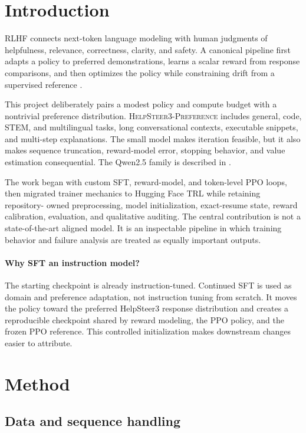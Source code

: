 \documentclass[10pt,twocolumn]{article}
\newcommand{\dataset}{\textsc{HelpSteer3-Preference}}
\newcommand{\trl}{\textsc{TRL}}
\begin{document}
\section{Introduction}

RLHF connects next-token language modeling with human judgments of helpfulness,
relevance, correctness, clarity, and safety. A canonical pipeline first adapts
a policy to preferred demonstrations, learns a scalar reward from response
comparisons, and then optimizes the policy while constraining drift from a
supervised reference \cite{stiennon2020,ouyang2022}.

This project deliberately pairs a modest policy and compute budget with a
nontrivial preference distribution. \dataset{} includes general, code, STEM,
and multilingual tasks, long conversational contexts, executable snippets,
and multi-step explanations. The small model makes iteration feasible, but it
also makes sequence truncation, reward-model error, stopping behavior, and
value estimation consequential. The Qwen2.5 family is described in
\cite{qwen25}.

The work began with custom SFT, reward-model, and token-level PPO loops, then
migrated trainer mechanics to Hugging Face \trl{} while retaining repository-
owned preprocessing, model initialization, exact-resume state, reward
calibration, evaluation, and qualitative auditing. The central contribution is
not a state-of-the-art aligned model. It is an inspectable pipeline in which
training behavior and failure analysis are treated as equally important
outputs.

\paragraph{Why SFT an instruction model?}
The starting checkpoint is already instruction-tuned. Continued SFT is used as
domain and preference adaptation, not instruction tuning from scratch. It
moves the policy toward the preferred HelpSteer3 response distribution and
creates a reproducible checkpoint shared by reward modeling, the PPO policy,
and the frozen PPO reference. This controlled initialization makes downstream
changes easier to attribute.

\section{Method}

\subsection{Data and sequence handling}
\end{document}
